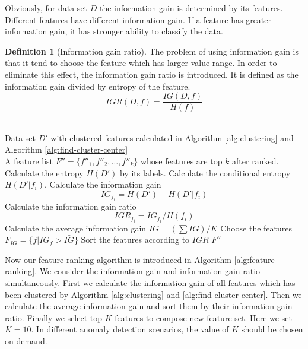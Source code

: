\documentclass{ieeeaccess}
\theoremstyle{definition}
\newtheorem{defn}{Definition}
\begin{document}
Obviously, for data set $D$ the information gain is determined by its features. Different features have different information gain. If a feature has greater information gain, it has stronger ability to classify the data.

\begin{defn}[Information gain ratio]
The problem of using information gain is that it tend to choose the feature which has larger value range. In order to eliminate this effect, the information gain ratio is introduced. It is defined as the information gain divided by entropy of the feature.
\begin{equation}
    IGR(D, f) = \frac{IG(D, f)}{H(f)}
\end{equation}
\end{defn}

\begin{algorithm}
    \caption{Feature ranking based on information gain}
    \label{alg:feature-ranking}
    \begin{algorithmic}[1]
        \REQUIRE ~~\\
            Data set $D'$ with clustered features calculated in Algorithm \ref{alg:clustering} and Algorithm \ref{alg:find-cluster-center}
        \ENSURE ~~\\
            A feature list $F''=\{f''_1, f''_2, \ldots, f''_k\}$ whose  features are top $k$ after ranked.
        \STATE Calculate the entropy $H(D')$ by its labels.
            \STATE Calculate the conditional entropy $H(D'|f_i)$.
            \STATE Calculate the information gain $$IG_{f_i} = H(D') - H(D'|f_i)$$
            \STATE Calculate the information gain ratio
            $$IGR_{f_i} = IG_{f_i}/H(f_i)$$
        \ENDFOR
        \STATE Calculate the average information gain $\bar{IG}=(\sum IG)/K$
        \STATE Choose the features $F_{IG}=\{f|IG_{f} > \bar{IG}\}$
        \STATE Sort the features according to $IGR$
        \RETURN $F''$
        \end{algorithmic}
\end{algorithm}

Now our feature ranking algorithm is introduced in Algorithm \ref{alg:feature-ranking}. We consider the information gain and information gain ratio simultaneously. First we calculate the information gain of all features which has been clustered by Algorithm \ref{alg:clustering} and \ref{alg:find-cluster-center}. Then we calculate the average information gain and sort them by their information gain ratio. Finally we select top $K$ features to compose new feature set. Here we set $K=10$. In different anomaly detection scenarios, the value of $K$ should be chosen on demand.
\end{document}
